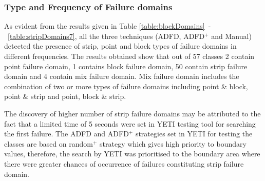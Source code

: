 \documentclass[runningheads,a4paper]{llncs}
\begin{document}



\subsubsection{Type and Frequency of Failure domains}

As evident from the results given in Table \ref{table:blockDomains}~-~\ref{table:stripDomains7}, all the three techniques (ADFD, ADFD$^+$ and Manual) detected the presence of strip, point and block types of failure domains in different frequencies. The results obtained show that out of 57 classes 2 contain point failure domain, 1 contains block failure domain, 50 contain strip failure domain and 4 contain mix failure domain. Mix failure domain includes the combination of two or more types of failure domains including point \& block, point \& strip and point, block \& strip.


The discovery of higher number of strip failure domains may be attributed to the fact that a limited time of 5 seconds were set in YETI testing tool for searching the first failure. The ADFD and ADFD$^+$ strategies set in YETI for testing the classes are based on random$^+$ strategy which gives high priority to boundary values, therefore, the search by YETI was prioritised to the boundary area where there were greater chances of occurrence of failures constituting strip failure domain.

\end{document}
